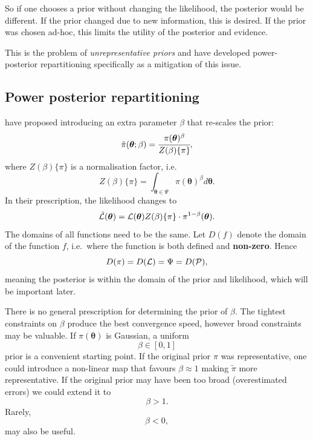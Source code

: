 \documentclass[usenatbib]{mnras}
\begin{document}
So if one chooses a prior without changing the likelihood, the
posterior would be different. If the prior changed due to new
information, this is desired. If the prior was chosen ad-hoc, this
limits the utility of the posterior and evidence.


This is the problem of \emph{unrepresentative priors} and
\citeauthor*{chen-ferroz-hobson} have developed power-posterior
repartitioning specifically as a mitigation of this issue. 

\subsection{Power posterior repartitioning}\label{sec:org68fff63}

\citeauthor{chen-ferroz-hobson} have proposed introducing an
extra parameter \(\beta\) that re-scales the prior:
\begin{equation*}
  \tilde{\pi}(\bm{\bm{\theta}};\beta) = \cfrac{\pi(\bm{\theta})^{\beta}}{Z(\beta)\{\pi\}},
\end{equation*}
where \(Z(\beta)\{\pi\}\) is a normalisation factor, i.e. 
\begin{equation*}
  Z(\beta)\{\pi\} = \int_{\bm{\theta} \in \Psi} \pi(\bm{\bm{\theta}})^{\beta}d\bm{\bm{\theta}}.
\end{equation*}
In their prescription, the likelihood changes to
\begin{equation*}
  \tilde{\cal L}(\bm{\theta}) = {\cal L}(\bm{\theta}) Z(\beta)\{\pi\} \cdot \pi^{1-\beta}(\bm{\theta}).
\end{equation*}
The domains of all functions need to be the same. Let
\(D(f)\) denote the domain of the function \(f\), i.e.~where the
function is both defined and \textbf{non-zero}. Hence
\begin{equation*}
  D(\pi) = D({\cal L}) = \Psi = D({\cal P}),
\end{equation*} 
meaning the posterior is within the domain of the prior and
likelihood, which will be important later.\label{domain-discussion}

There is no general prescription for determining the prior of
\(\beta\). The tightest constraints on \(\beta\) produce the best
convergence speed, however broad constraints may be valuable.  If
\(\pi(\bm{\theta})\) is Gaussian, a uniform 
\[\beta\in[0,1]\] prior is a convenient starting point.
If the original prior \(\pi\) was representative, one could introduce
a non-linear map that favours \(\beta\approx 1\) making
\(\tilde{\pi}\) more representative. If the original prior may have
been too broad (overestimated errors) we could extend it
to \[\beta>1.\] Rarely, \[\beta<0,\] may also be useful.
\end{document}
